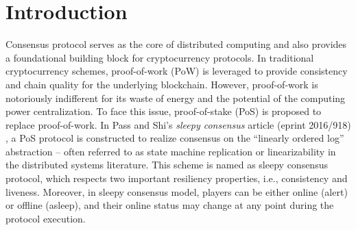 \documentclass{llncs}
\begin{document}
%
\newpage
\tableofcontents
\newpage
%
\section{Introduction}
\quad Consensus protocol serves as the core of distributed computing and also provides a foundational building block for cryptocurrency protocols. In traditional cryptocurrency schemes, proof-of-work (PoW) is leveraged to provide consistency and chain quality for the underlying blockchain. However, proof-of-work is notoriously indifferent for its waste of energy and the potential of the computing power centralization. To face this issue, proof-of-stake (PoS) is proposed to replace proof-of-work. In  Pass and Shi's \emph{sleepy consensus} article (eprint 2016/918) \cite{Sleepy}, a PoS protocol is constructed to realize consensus on the “linearly ordered log” abstraction -- often referred to as state machine replication or linearizability in the distributed systems literature. This scheme is named as sleepy consensus protocol, which respects two important resiliency properties, i.e., consistency and liveness. Moreover, in sleepy consensus model, players can be either online (alert) or offline (asleep), and their online status may change at any point during the protocol execution.
\end{document}
